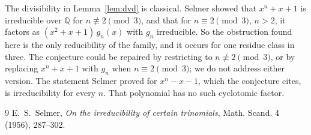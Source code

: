 \documentclass[11pt]{article}
\theoremstyle{plain}
\theoremstyle{remark}
\begin{document}
The divisibility in Lemma~\ref{lem:dvd} is classical. Selmer \cite{selmer}
showed that $x^n+x+1$ is irreducible over $\mathbb Q$ for $n\not\equiv2\pmod
3$, and that for $n\equiv2\pmod3$, $n>2$, it factors as $(x^2+x+1)\,g_n(x)$
with $g_n$ irreducible. So the obstruction found here is the only reducibility
of the family, and it occurs for one residue class in three. The conjecture
could be repaired by restricting to $n\not\equiv2\pmod3$, or by replacing
$x^n+x+1$ with $g_n$ when $n\equiv2\pmod3$; we do not address either version.
The statement Selmer proved for $x^n-x-1$, which the conjecture cites, is
irreducibility for every $n$. That polynomial has no such cyclotomic factor.

\begin{thebibliography}{9}
 E.~S.~Selmer, \emph{On the irreducibility of certain
  trinomials}, Math. Scand. 4 (1956), 287--302.
\end{thebibliography}
\end{document}
